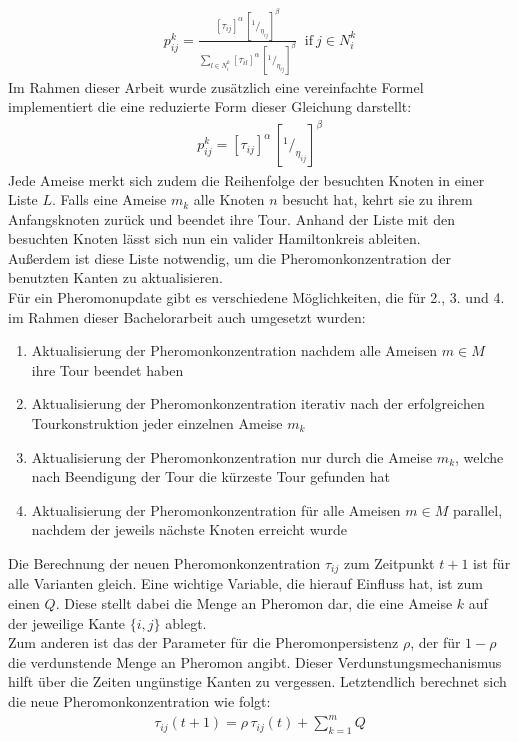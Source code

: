 \documentclass[doktyp=barbeit, sprache=german]{TUBAFarbeiten}
\newcommand*\rfrac[2]{{}^{#1}\!/_{#2}}
\begin{document}
\begin{align}
\label{eq:Prob}
p^k_{ij} = \frac{[\tau_{ij}]^\alpha \, [\rfrac{1}{\eta_{ij}}]^\beta}{\sum\nolimits_{l\in N^k_i} [\tau_{il}]^\alpha \, [\rfrac{1}{\eta_{ij}}]^\beta} \; \; \text{if}\: j \in N^k_i    
\end{align}
Im Rahmen dieser Arbeit wurde zusätzlich eine vereinfachte Formel  implementiert die eine reduzierte Form dieser Gleichung darstellt:
\begin{align}
\label{eq:ProbSimple}
p^k_{ij} = [\tau_{ij}]^\alpha \, [\rfrac{1}{\eta_{ij}}]^\beta
\end{align}
Jede Ameise merkt sich zudem die Reihenfolge der besuchten Knoten in einer Liste $L$. Falls eine Ameise $m_k$ alle Knoten $n$ besucht hat, kehrt sie zu ihrem Anfangsknoten zurück und beendet ihre Tour. Anhand der Liste mit den besuchten Knoten lässt sich nun ein valider Hamiltonkreis ableiten. 
\\Außerdem ist diese Liste notwendig, um die Pheromonkonzentration der benutzten Kanten zu aktualisieren.
\\Für ein Pheromonupdate gibt es verschiedene Möglichkeiten, die für 2., 3. und 4. im Rahmen dieser Bachelorarbeit auch umgesetzt wurden: 
\begin{enumerate}
\label{enum:Update}
\item Aktualisierung der Pheromonkonzentration nachdem alle Ameisen $m \in M$ ihre Tour beendet haben
\item Aktualisierung der Pheromonkonzentration iterativ nach der erfolgreichen Tourkonstruktion jeder einzelnen Ameise $m_k$
\item Aktualisierung der Pheromonkonzentration nur durch die Ameise $m_k$, welche nach Beendigung der Tour die kürzeste Tour gefunden hat
\item Aktualisierung der Pheromonkonzentration für alle Ameisen $m \in M$ parallel, nachdem der jeweils nächste Knoten erreicht wurde
\end{enumerate}
Die Berechnung der neuen Pheromonkonzentration $\tau_{ij}$ zum Zeitpunkt $t + 1$ ist für alle Varianten gleich. Eine wichtige Variable, die hierauf Einfluss hat, ist zum einen $Q$. Diese stellt dabei die Menge an Pheromon dar, die eine Ameise $k$ auf der jeweilige Kante $\{i,j\}$ ablegt. 
\\Zum anderen ist das der Parameter für die Pheromonpersistenz $\rho$, der für $1-\rho$ die verdunstende Menge an Pheromon angibt. Dieser Verdunstungsmechanismus hilft über die Zeiten ungünstige Kanten zu \glqq vergessen\grqq. Letztendlich berechnet sich die neue Pheromonkonzentration wie folgt:
\begin{align}
\label{eq:Pheromone}
\tau_{ij}(t+1) = \rho \, \tau_{ij}(t) + \sum_{k=1}^m Q
\end{align}
\newpage
\end{document}
